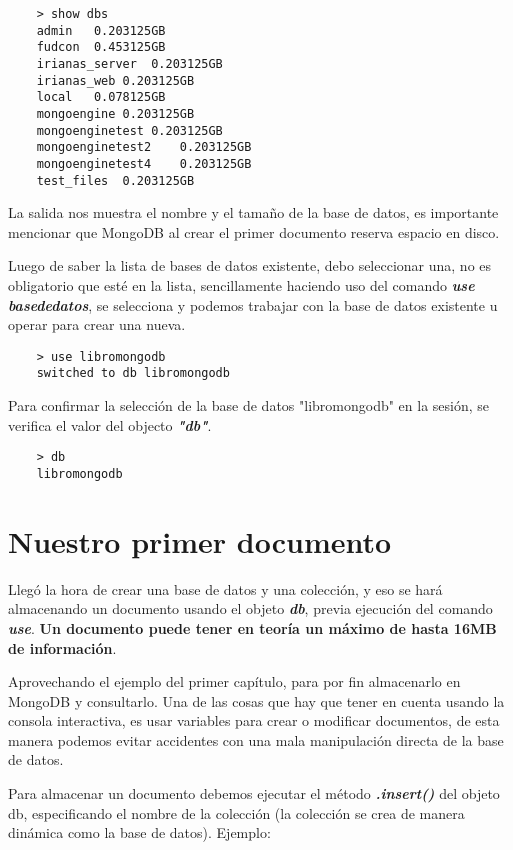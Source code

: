 \begin{lstlisting}
    > show dbs
    admin	0.203125GB
    fudcon	0.453125GB
    irianas_server	0.203125GB
    irianas_web	0.203125GB
    local	0.078125GB
    mongoengine	0.203125GB
    mongoenginetest	0.203125GB
    mongoenginetest2	0.203125GB
    mongoenginetest4	0.203125GB
    test_files	0.203125GB
\end{lstlisting}

La salida nos muestra el nombre y el tama\~no de la base de datos, es importante mencionar que MongoDB al crear el primer documento reserva espacio en disco.

Luego de saber la lista de bases de datos existente, debo seleccionar una, no es obligatorio que est\'e en la lista, sencillamente haciendo uso del comando \textit{\textbf{use basededatos}}, se selecciona y podemos trabajar con la base de datos existente u operar para crear una nueva.

\begin{lstlisting}
    > use libromongodb
    switched to db libromongodb
\end{lstlisting}

Para confirmar la selecci\'on de la base de datos "libromongodb" en la sesi\'on, se verifica el valor del objecto \textit{\textbf{"db"}}.

\begin{lstlisting}
    > db
    libromongodb
\end{lstlisting}

\section{Nuestro primer documento}

Lleg\'o la hora de crear una base de datos y una colecci\'on, y eso se har\'a almacenando un documento usando el objeto \textit{\textbf{db}}, previa ejecuci\'on del comando \textit{\textbf{use}}. \textbf{Un documento puede tener en teor\'ia un m\'aximo de hasta 16MB de informaci\'on}. 

Aprovechando el ejemplo del primer cap\'itulo, para por fin almacenarlo en MongoDB y consultarlo. Una de las cosas que hay que tener en cuenta usando la consola interactiva, es usar variables para crear o modificar documentos, de esta manera podemos evitar accidentes con una mala manipulaci\'on directa de la base de datos.

Para almacenar un documento debemos ejecutar el m\'etodo \textit{\textbf{.insert()}} del objeto db, especificando el nombre de la colecci\'on (la colecci\'on se crea de manera din\'amica como la base de datos). Ejemplo:

